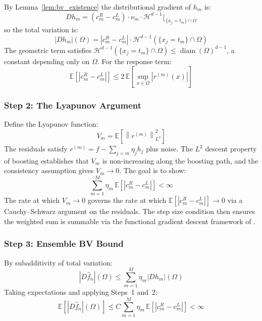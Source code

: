 \documentclass[12pt]{article}
\newcommand{\norm}[1]{\left\| #1 \right\|}
\newcommand{\E}{\mathbb{E}}
\newcommand{\fn}{\hat{f}_n}
\begin{document}
	By Lemma~\ref{lem:bv_existence} the distributional gradient of $h_m$ is:
	\begin{equation}
		Dh_m = (c_m^R - c_m^L) \cdot \nu_m \cdot
		\mathcal{H}^{d-1}\lfloor_{\{x_j = t_m\} \cap \Omega}
	\end{equation}
	so the total variation is:
	\begin{equation}
		|Dh_m|(\Omega) =
		|c_m^R - c_m^L| \cdot
		\mathcal{H}^{d-1}\!\left(\{x_j = t_m\} \cap \Omega\right)
	\end{equation}
	The geometric term satisfies
	$\mathcal{H}^{d-1}(\{x_j = t_m\} \cap \Omega) \leq \operatorname{diam}(\Omega)^{d-1}$,
	a constant depending only on $\Omega$. For the response term:
	\begin{equation}
		\E\!\left[|c_m^R - c_m^L|\right]
		\leq 2\,\E\!\left[\sup_{x \in \Omega} |r^{(m)}(x)|\right]
	\end{equation}
	
	\subsubsection*{Step 2: The Lyapunov Argument}
	
	Define the Lyapunov function:
	\begin{equation}
		V_m = \E\!\left[\norm{r^{(m)}}_{L^2}^2\right]
	\end{equation}
	The residuals satisfy $r^{(m)} = f - \sum_{j<m} \eta_j h_j$ plus noise. The
	$L^2$ descent property of boosting \citep{buhlmann2003boosting} establishes
	that $V_m$ is non-increasing along the boosting path, and the consistency
	assumption gives $V_m \to 0$. The goal is to show:
	\begin{equation}
		\sum_{m=1}^M \eta_m \,\E\!\left[|c_m^R - c_m^L|\right] < \infty
	\end{equation}
	The rate at which $V_m \to 0$ governs the rate at which
	$\E[|c_m^R - c_m^L|] \to 0$ via a Cauchy--Schwarz argument on the residuals.
	The step size condition then ensures the weighted sum is summable via the
	functional gradient descent framework of \citet{mason2000boosting}.
	
	\subsubsection*{Step 3: Ensemble BV Bound}
	
	By subadditivity of total variation:
	\begin{equation}
		|D\fn|(\Omega) \leq \sum_{m=1}^M \eta_m |Dh_m|(\Omega)
	\end{equation}
	Taking expectations and applying Steps~1 and~2:
	\begin{equation}
		\E\!\left[|D\fn|(\Omega)\right]
		\leq C \sum_{m=1}^M \eta_m \,\E\!\left[|c_m^R - c_m^L|\right]
		< \infty
	\end{equation}
	
\end{document}
